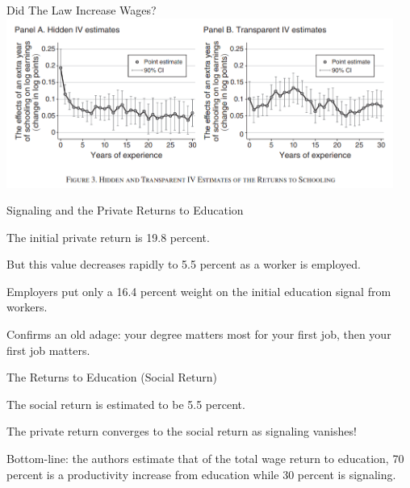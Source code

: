 \documentclass[aspectratio=169,usenames,dvipsnames]{beamer}
\newenvironment{wideitemize}{\itemize\addtolength{\itemsep}{10pt}}{\enditemize}
\begin{document}
\begin{frame}{Did The Law Increase Wages?}
\centering
\includegraphics[width=0.95\textwidth]{pictures/wages_norway.png}
\end{frame}

\begin{frame}{Signaling and the Private Returns to Education}

\begin{wideitemize}
    \item The initial private return is 19.8 percent.
    \item But this value decreases rapidly to 5.5 percent as a worker is employed.
    \item Employers put only a 16.4 percent weight on the initial education signal from workers.
    \item Confirms an old adage: your degree matters most for your first job, then your first job matters.
\end{wideitemize}
    
\end{frame}
\begin{frame}{The Returns to Education (Social Return)}

\begin{wideitemize}
    \item The social return is estimated to be 5.5 percent.
    \item The private return converges to the social return as signaling vanishes!
    \item Bottom-line: the authors estimate that of the total wage return to education, 70 percent is a productivity increase from education while 30 percent is signaling.
\end{wideitemize}
    
\end{frame}
\end{document}
